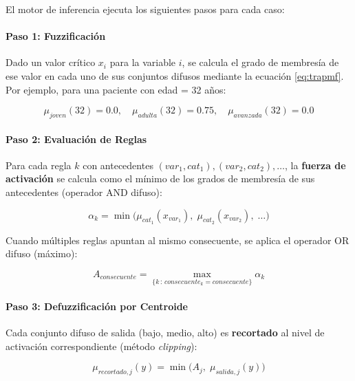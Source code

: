 \documentclass[11pt]{article}
\begin{document}
El motor de inferencia ejecuta los siguientes pasos para cada caso:

\paragraph{Paso 1: Fuzzificación}

Dado un valor cr\'itico $x_i$ para la variable $i$, se calcula el grado de membres\'ia de ese valor en cada uno de sus conjuntos difusos mediante la ecuaci\'on \eqref{eq:trapmf}. Por ejemplo, para una paciente con edad = 32 a\~nos:

\begin{equation}
    \mu_{joven}(32) = 0.0, \quad \mu_{adulta}(32) = 0.75, \quad \mu_{avanzada}(32) = 0.0
\end{equation}


\paragraph{Paso 2: Evaluación de Reglas}

Para cada regla $k$ con antecedentes $(var_1, cat_1), (var_2, cat_2), \ldots$, la \textbf{fuerza de activaci\'on} se calcula como el m\'inimo de los grados de membres\'ia de sus antecedentes (operador AND difuso):

\begin{equation}
    \alpha_k = \min\bigl(\mu_{cat_1}(x_{var_1}),\; \mu_{cat_2}(x_{var_2}),\; \ldots\bigr)
\end{equation}

Cuando m\'ultiples reglas apuntan al mismo consecuente, se aplica el operador OR difuso (m\'aximo):

\begin{equation}
    A_{consecuente} = \max_{\{k \,:\, consecuente_k = consecuente\}} \alpha_k
\end{equation}


\paragraph{Paso 3: Defuzzificación por Centroide}

Cada conjunto difuso de salida (bajo, medio, alto) es \textbf{recortado} al nivel de activaci\'on correspondiente (m\'etodo \textit{clipping}):

\begin{equation}
    \mu_{recortado,j}(y) = \min\bigl(A_j,\; \mu_{salida,j}(y)\bigr)
\end{equation}
\end{document}
